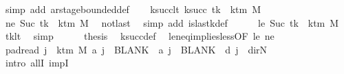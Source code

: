 \begin{isabellebody}
\ {\isacharparenleft}{\kern0pt}simp\ add{\isacharcolon}{\kern0pt}\ ar{\isacharunderscore}{\kern0pt}stage{\isacharunderscore}{\kern0pt}bounded{\isacharunderscore}{\kern0pt}def{\isacharparenright}{\kern0pt}\isanewline
\ \ \isamarkupfalse%
\ ksucc{\isacharunderscore}{\kern0pt}lt{\isacharcolon}{\kern0pt}\ {\isachardoublequoteopen}k{\isacharunderscore}{\kern0pt}succ\ tk\ {\isacharless}{\kern0pt}\ k{\isacharunderscore}{\kern0pt}tm\ M{\isachardoublequoteclose}\isanewline
\ \ \isamarkupfalse%
\ {\isacharminus}{\kern0pt}\isanewline
\ \ \ \ \isamarkupfalse%
\ ne{\isacharcolon}{\kern0pt}\ {\isachardoublequoteopen}Suc\ tk\ {\isasymnoteq}\ k{\isacharunderscore}{\kern0pt}tm\ M{\isachardoublequoteclose}\ \isamarkupfalse%
\ notlast\ \isamarkupfalse%
\ {\isacharparenleft}{\kern0pt}simp\ add{\isacharcolon}{\kern0pt}\ is{\isacharunderscore}{\kern0pt}last{\isacharunderscore}{\kern0pt}k{\isacharunderscore}{\kern0pt}def{\isacharparenright}{\kern0pt}\isanewline
\ \ \ \ \isamarkupfalse%
\ le{\isacharcolon}{\kern0pt}\ {\isachardoublequoteopen}Suc\ tk\ {\isasymle}\ k{\isacharunderscore}{\kern0pt}tm\ M{\isachardoublequoteclose}\ \isamarkupfalse%
\ tk{\isacharunderscore}{\kern0pt}lt\ \isamarkupfalse%
\ simp\isanewline
\ \ \ \ \isamarkupfalse%
\ {\isacharquery}{\kern0pt}thesis\ \isamarkupfalse%
\ k{\isacharunderscore}{\kern0pt}succ{\isacharunderscore}{\kern0pt}def\ \isamarkupfalse%
\ le{\isacharunderscore}{\kern0pt}neq{\isacharunderscore}{\kern0pt}implies{\isacharunderscore}{\kern0pt}less{\isacharbrackleft}{\kern0pt}OF\ le\ ne{\isacharbrackright}{\kern0pt}\ \isakeywordONE{{\isachardot}{\kern0pt}}\isamarkupfalse%
\isanewline
\ \ \isamarkupfalse%
\isanewline
\ \ \isamarkupfalse%
\ pad{\isacharunderscore}{\kern0pt}read{\isacharcolon}{\kern0pt}\ {\isachardoublequoteopen}{\isasymforall}j\ {\isasymge}\ k{\isacharunderscore}{\kern0pt}tm\ M{\isachardot}{\kern0pt}\ {\isacharquery}{\kern0pt}a\ j\ {\isacharequal}{\kern0pt}\ BLANK{}\ {\isasymand}\ {\isacharquery}{\kern0pt}a\ j\ {\isacharequal}{\kern0pt}\ BLANK{}\ {\isasymand}\ {\isacharquery}{\kern0pt}d\ j\ {\isacharequal}{\kern0pt}\ dir{\isachardot}{\kern0pt}N{\isachardoublequoteclose}\isanewline
\ \ \isamarkupfalse%
\ {\isacharparenleft}{\kern0pt}intro\ allI\ impI{\isacharparenright}{\kern0pt}\isanewline
\ \ \ \ \isamarkupfalse%

\end{isabellebody}
